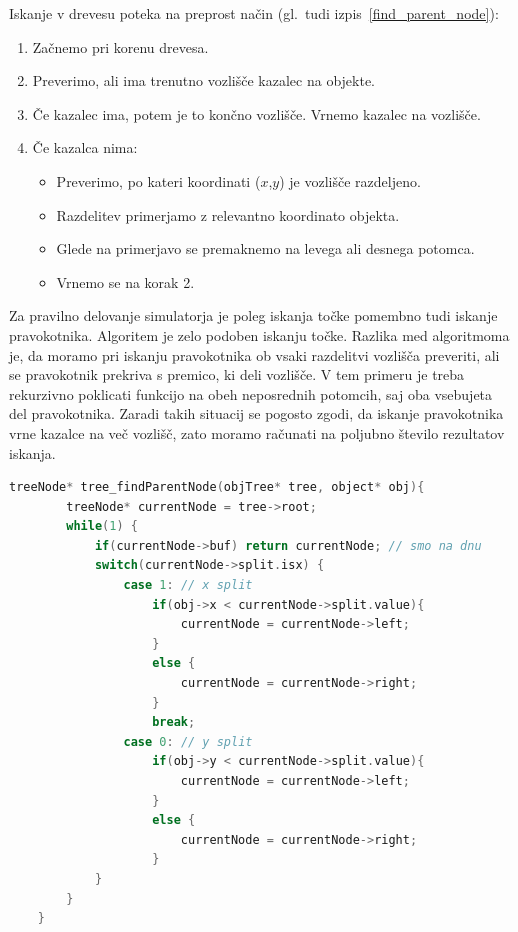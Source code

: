 \documentclass[a4paper,12pt]{article}
\begin{document}
\begin{samepage}
Iskanje v drevesu poteka na preprost način (gl.\ tudi izpis~\ref{find_parent_node}):
    \begin{enumerate}
        \item Začnemo pri korenu drevesa.
        \item Preverimo, ali ima trenutno vozlišče kazalec na objekte.
        \item Če kazalec ima, potem je to končno vozlišče. Vrnemo kazalec na vozlišče.
        \item Če kazalca nima:
        \begin{itemize}
            \item Preverimo, po kateri koordinati ($x$,$y$) je vozlišče razdeljeno.
            \item Razdelitev primerjamo z relevantno koordinato objekta.
            \item Glede na primerjavo se premaknemo na levega ali desnega potomca.
            \item Vrnemo se na korak 2.
        \end{itemize}    
    \end{enumerate}
\end{samepage}

Za pravilno delovanje simulatorja je poleg iskanja točke pomembno tudi iskanje pravokotnika. Algoritem je zelo podoben
iskanju točke. Razlika med algoritmoma je, da moramo pri iskanju pravokotnika
ob vsaki razdelitvi vozlišča preveriti, ali se pravokotnik prekriva s premico, ki deli vozlišče. V tem
primeru je treba rekurzivno poklicati funkcijo na obeh neposrednih potomcih, saj oba vsebujeta del pravokotnika. Zaradi takih
situacij se pogosto zgodi, da iskanje pravokotnika vrne kazalce na več vozlišč, zato moramo računati na poljubno število
rezultatov iskanja.

\newpage

\begin{lstlisting}[float, caption={Iskanje vozlišča, ki vsebuje objekt}, label=find_parent_node, language=C]
    treeNode* tree_findParentNode(objTree* tree, object* obj){
        treeNode* currentNode = tree->root;
        while(1) {
            if(currentNode->buf) return currentNode; // smo na dnu
            switch(currentNode->split.isx) {
                case 1: // x split
                    if(obj->x < currentNode->split.value){
                        currentNode = currentNode->left;
                    }
                    else {
                        currentNode = currentNode->right;
                    }
                    break;
                case 0: // y split
                    if(obj->y < currentNode->split.value){
                        currentNode = currentNode->left;
                    }
                    else {
                        currentNode = currentNode->right;
                    }
            }
        }
    }
\end{lstlisting}
\end{document}
